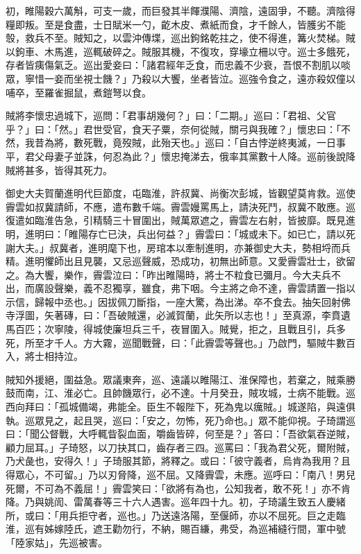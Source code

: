 \begin{pinyinscope}
 初，睢陽穀六萬斛，可支一歲，而巨發其半餫濮陽、濟陰，遠固爭，不聽。濟陰得糧即叛。至是食盡，士日賦米一勺，齕木皮、煮紙而食，才千餘人，皆臒劣不能彀，救兵不至。賊知之，以雲沖傳堞，巡出鉤銘乾拄之，使不得進，篝火焚梯。賊以鉤車、木馬進，巡輒破碎之。賊服其機，不復攻，穿壕立柵以守。巡士多餓死，存者皆痍傷氣乏。巡出愛妾曰：「諸君經年乏食，而忠義不少衰，吾恨不割肌以啖眾，寧惜一妾而坐視士饑？」乃殺以大饗，坐者皆泣。巡強令食之，遠亦殺奴僮以哺卒，至羅雀掘鼠，煮鎧弩以食。



 賊將李懷忠過城下，巡問：「君事胡幾何？」曰：「二期。」巡曰：「君祖、父官乎？」曰：「然。」君世受官，食天子粟，奈何從賊，關弓與我確？」懷忠曰：「不然，我昔為將，數死戰，竟歿賊，此殆天也。」巡曰：「自古悖逆終夷滅，一日事平，君父母妻子並誅，何忍為此？」懷忠掩涕去，俄率其黨數十人降。巡前後說降賊將甚多，皆得其死力。



 御史大夫賀蘭進明代巨節度，屯臨淮，許叔冀、尚衡次彭城，皆觀望莫肯救。巡使霽雲如叔冀請師，不應，遣布數千端。霽雲嫚罵馬上，請決死鬥，叔冀不敢應。巡復遣如臨淮告急，引精騎三十冒圍出，賊萬眾遮之，霽雲左右射，皆披靡。既見進明，進明曰：「睢陽存亡已決，兵出何益？」霽雲曰：「城或未下。如已亡，請以死謝大夫。」叔冀者，進明麾下也，房琯本以牽制進明，亦兼御史大夫，勢相埒而兵精。進明懼師出且見襲，又忌巡聲威，恐成功，初無出師意。又愛霽雲壯士，欲留之。為大饗，樂作，霽雲泣曰：「昨出睢陽時，將士不粒食已彌月。今大夫兵不出，而廣設聲樂，義不忍獨享，雖食，弗下咽。今主將之命不達，霽雲請置一指以示信，歸報中丞也。」因拔佩刀斷指，一座大驚，為出涕。卒不食去。抽矢回射佛寺浮圖，矢著磚，曰：「吾破賊還，必滅賀蘭，此矢所以志也！」至真源，李賁遺馬百匹；次寧陵，得城使廉坦兵三千，夜冒圍入。賊覺，拒之，且戰且引，兵多死，所至才千人。方大霧，巡聞戰聲，曰：「此霽雲等聲也。」乃啟門，驅賊牛數百入，將士相持泣。



 賊知外援絕，圍益急。眾議東奔，巡、遠議以睢陽江、淮保障也，若棄之，賊乘勝鼓而南，江、淮必亡。且帥饑眾行，必不達。十月癸丑，賊攻城，士病不能戰。巡西向拜曰：「孤城備竭，弗能全。臣生不報陛下，死為鬼以癘賊。」城遂陷，與遠俱執。巡眾見之，起且哭，巡曰：「安之，勿怖，死乃命也。」眾不能仰視。子琦謂巡曰：「聞公督戰，大呼輒眥裂血面，嚼齒皆碎，何至是？」答曰：「吾欲氣吞逆賊，顧力屈耳。」子琦怒，以刀抉其口，齒存者三四。巡罵曰：「我為君父死，爾附賊，乃犬彘也，安得久！」子琦服其節，將釋之。或曰：「彼守義者，烏肯為我用？且得眾心，不可留。」乃以刃脅降，巡不屈。又降霽雲，未應。巡呼曰：「南八！男兒死爾，不可為不義屈！」霽雲笑曰：「欲將有為也，公知我者，敢不死！」亦不肯降。乃與姚訚、雷萬春等三十六人遇害。巡年四十九。初，子琦議生致五人慶緒所，或曰：「用兵拒守者，巡也。」乃送遠洛陽，至偃師，亦以不屈死。巨之走臨淮，巡有姊嫁陸氏，遮王勸勿行，不納，賜百縑，弗受，為巡補縫行間，軍中號「陸家姑」，先巡被害。




\end{pinyinscope}
